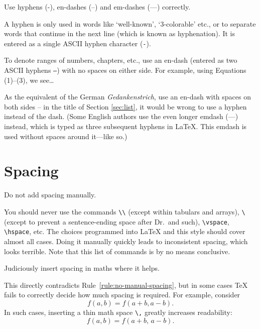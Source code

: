 \begin{Rule}
  Use hyphens (-), en-dashes (--) and em-dashes (---) correctly.
\end{Rule}

A hyphen is only used in words like `well-known', `$3$-colorable'
etc., or to separate words that continue in the next line (which is
known as hyphenation).  It is entered as a single ASCII hyphen
character (\texttt{-}).

To denote ranges of numbers, chapters, etc., use an en-dash (entered
as two ASCII hyphens \texttt{--}) with no spaces on either side.  For
example, using Equations (1)--(3), we see\ldots

As the equivalent of the German \emph{Gedankenstrich}, use an en-dash
with spaces on both sides -- in the title of Section \ref{sec:list},
it would be wrong to use a hyphen instead of the dash. (Some English
authors use the even longer emdash (---) instead, which is typed as
three subsequent hyphens in \LaTeX. This emdash is used without spaces
around it---like so.)


\section*{Spacing}

\begin{Rule}
  \label{rule:no-manual-spacing}
  Do not add spacing manually.
\end{Rule}

You should never use the commands \lstinline-\\- (except within
tabulars and arrays), \lstinline[showspaces=true]-\ - (except to
prevent a sentence-ending space after Dr.\ and such),
\lstinline-\vspace-, \lstinline-\hspace-, etc.  The choices programmed
into \LaTeX{} and this style should cover almost all cases.  Doing it
manually quickly leads to inconsistent spacing, which looks terrible.
Note that this list of commands is by no means conclusive.

\begin{Rule}
  Judiciously insert spacing in maths where it helps.
\end{Rule}

This directly contradicts Rule~\ref{rule:no-manual-spacing}, but in
some cases \TeX{} fails to correctly decide how much spacing is
required.  For example, consider
\begin{displaymath}
  f(a,b) = f(a+b, a-b).
\end{displaymath}
In such cases, inserting a thin math space \lstinline-\,- greatly
increases readability:
\begin{displaymath}
  f(a,b) = f(a+b,\, a-b).
\end{displaymath}

